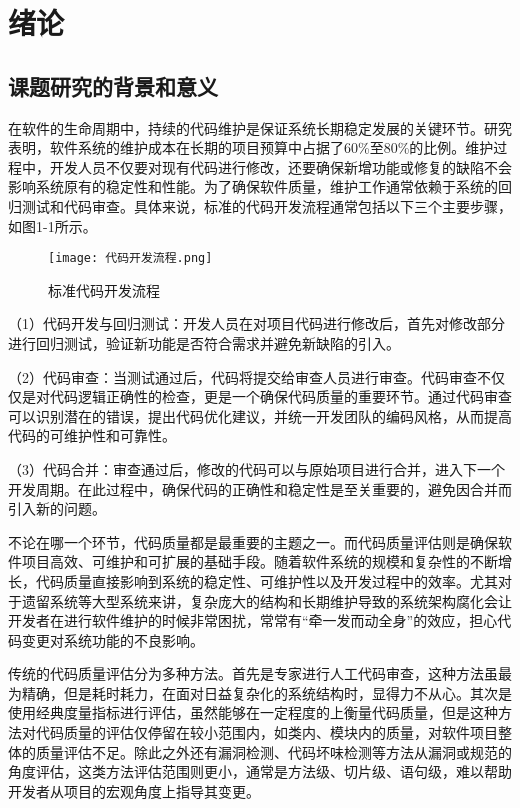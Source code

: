 
\chapter{绪论}

\section{课题研究的背景和意义}

在软件的生命周期中，持续的代码维护是保证系统长期稳定发展的关键环节。研究表明，软件系统的维护成本在长期的项目预算中占据了60\%至80\%的比例\cite{2012Maintenance}。维护过程中，开发人员不仅要对现有代码进行修改，还要确保新增功能或修复的缺陷不会影响系统原有的稳定性和性能。为了确保软件质量，维护工作通常依赖于系统的回归测试和代码审查。具体来说，标准的代码开发流程通常包括以下三个主要步骤，如图1-1所示。

\begin{figure}[h]
\centering
\texttt{[image: 代码开发流程.png]}
\caption{标准代码开发流程}
\end{figure}

（1）代码开发与回归测试：开发人员在对项目代码进行修改后，首先对修改部分进行回归测试，验证新功能是否符合需求并避免新缺陷的引入。

（2）代码审查：当测试通过后，代码将提交给审查人员进行审查。代码审查不仅仅是对代码逻辑正确性的检查，更是一个确保代码质量的重要环节。通过代码审查可以识别潜在的错误，提出代码优化建议，并统一开发团队的编码风格，从而提高代码的可维护性和可靠性。

（3）代码合并：审查通过后，修改的代码可以与原始项目进行合并，进入下一个开发周期。在此过程中，确保代码的正确性和稳定性是至关重要的，避免因合并而引入新的问题。

不论在哪一个环节，代码质量都是最重要的主题之一。而代码质量评估则是确保软件项目高效、可维护和可扩展的基础手段。随着软件系统的规模和复杂性的不断增长，代码质量直接影响到系统的稳定性、可维护性以及开发过程中的效率。尤其对于遗留系统等大型系统来讲，复杂庞大的结构和长期维护导致的系统架构腐化会让开发者在进行软件维护的时候非常困扰，常常有“牵一发而动全身”的效应，担心代码变更对系统功能的不良影响。

传统的代码质量评估分为多种方法。首先是专家进行人工代码审查，这种方法虽最为精确，但是耗时耗力，在面对日益复杂化的系统结构时，显得力不从心\cite{2016Microservices}。其次是使用经典度量指标进行评估，虽然能够在一定程度的上衡量代码质量，但是这种方法对代码质量的评估仅停留在较小范围内，如类内、模块内的质量，对软件项目整体的质量评估不足。除此之外还有漏洞检测、代码坏味检测等方法从漏洞或规范的角度评估，这类方法评估范围则更小，通常是方法级、切片级、语句级，难以帮助开发者从项目的宏观角度上指导其变更。

